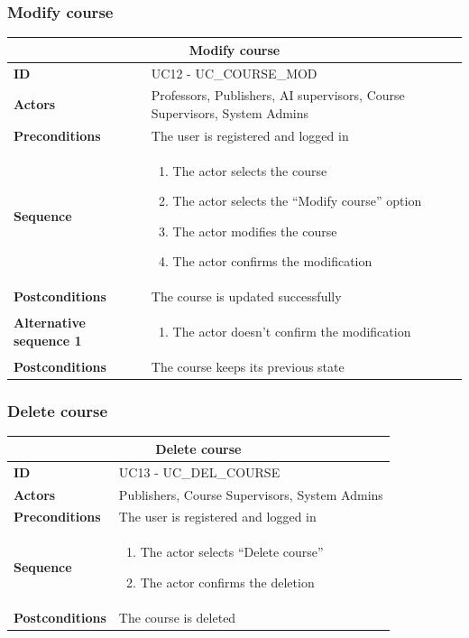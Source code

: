 \subsubsection{Modify course}
\begin{tabular}{|m{2.5cm}|m{8cm}|}
	\hline
	\multicolumn{2}{|c|}{Modify course} \\
	\hline
	\textbf{ID} & UC12 - UC\_COURSE\_MOD \\
	\hline
	\textbf{Actors} & Professors, Publishers, AI supervisors, Course Supervisors, System Admins \\
	\hline
	\textbf{Preconditions} & The user is registered and logged in \\
	\hline
	\textbf{Sequence} & 
	\begin{enumerate}
		\item The actor selects the course
		\item The actor selects the “Modify course” option
		\item The actor modifies the course
		\item The actor confirms the modification
	\end{enumerate} \\
	\hline
	\textbf{Postconditions} & The course is updated successfully \\
	\hline
	
	\textbf{Alternative sequence 1} & 
	\begin{enumerate}
		\item The actor doesn’t confirm the modification
	\end{enumerate} \\
	\hline
	\textbf{Postconditions} & The course keeps its previous state \\
	\hline
\end{tabular}

\subsubsection{Delete course}
\begin{tabular}{|m{2.5cm}|m{8cm}|}
	\hline
	\multicolumn{2}{|c|}{Delete course} \\
	\hline
	\textbf{ID} & UC13 - UC\_DEL\_COURSE \\
	\hline
	\textbf{Actors} & Publishers, Course Supervisors, System Admins \\
	\hline
	\textbf{Preconditions} & The user is registered and logged in \\
	\hline
	\textbf{Sequence} & 
	\begin{enumerate}
		\item The actor selects “Delete course”
		\item The actor confirms the deletion
	\end{enumerate} \\
	\hline
	\textbf{Postconditions} & The course is deleted \\
	\hline
\end{tabular}


